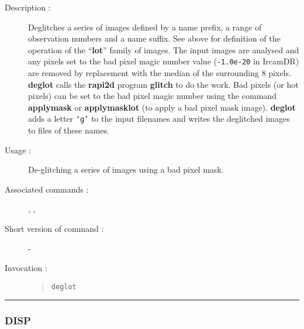\begin{description}

\item[Description :] Deglitches a series of images defined by a name
prefix, a range of observation numbers and a name suffix.  See above
for definition of the operation of the ``{\bf lot}'' family of images.
The input images are analysed and any pixels set to the bad pixel magic
number value ({\tt -1.0e-20} in {\sc IrcamDR}) are removed by replacement
with the median of the surrounding 8 pixels.  {\bf deglot} calls the {\bf
rapi2d} program {\bf glitch} to do the work.  Bad pixels (or hot pixels) can
be set to the bad pixel magic number using the command {\bf applymask} or
{\bf applymasklot} (to apply a bad pixel mask image).  {\bf deglot}
adds a letter {\tt `g'} to the input filenames and writes the deglitched
images to files of these names.

\item[Usage :] De-glitching a series of images using a bad pixel mask.
\item[Associated commands :] {\tt {}}, 
{\tt {}}, 
{\tt {}}
\item[Short version of command :] -
\item[Invocation :]

\begin{quote}{\tt  deglot }\end{quote}

\end{description}

\hrule 
\subsubsection*{\label{DISP}DISP}

